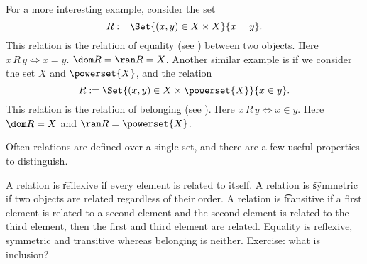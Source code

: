 For a more interesting example, consider the set
\[
  R := \Set{(x, y) \in X \times X}{x = y}.
\]
This relation is the relation of equality (see ) between two objects.
Here $x\,R\,y \iff x = y$.
$\dom R = \ran R = X$.
Another similar example is if we consider the set $X$ and $\powerset{X}$, and the relation
\[
  R := \Set{(x, y) \in X \times \powerset{X}}{x \in y}.
\]
This relation is the relation of belonging (see ).
Here $x\,R\,y \iff x \in y$.
Here $\dom R = X$ and $\ran R = \powerset{X}$.

%


Often relations are defined over a single set, and there are a few useful properties to distinguish.

A relation is \t{reflexive} if every element is related to itself.
A relation is \t{symmetric} if two objects are related regardless of their order.
A relation is \t{transitive} if a first element is related to a second element and the second element is related to the third element, then the first and third element are related.
Equality is reflexive, symmetric and transitive whereas belonging is neither.
Exercise: what is inclusion?


%
%
